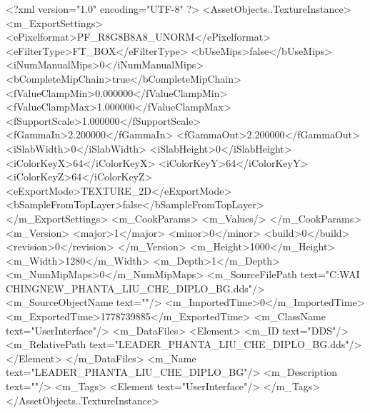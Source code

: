 <?xml version="1.0" encoding="UTF-8" ?>
<AssetObjects..TextureInstance>
	<m_ExportSettings>
		<ePixelformat>PF_R8G8B8A8_UNORM</ePixelformat>
		<eFilterType>FT_BOX</eFilterType>
		<bUseMips>false</bUseMips>
		<iNumManualMips>0</iNumManualMips>
		<bCompleteMipChain>true</bCompleteMipChain>
		<fValueClampMin>0.000000</fValueClampMin>
		<fValueClampMax>1.000000</fValueClampMax>
		<fSupportScale>1.000000</fSupportScale>
		<fGammaIn>2.200000</fGammaIn>
		<fGammaOut>2.200000</fGammaOut>
		<iSlabWidth>0</iSlabWidth>
		<iSlabHeight>0</iSlabHeight>
		<iColorKeyX>64</iColorKeyX>
		<iColorKeyY>64</iColorKeyY>
		<iColorKeyZ>64</iColorKeyZ>
		<eExportMode>TEXTURE_2D</eExportMode>
		<bSampleFromTopLayer>false</bSampleFromTopLayer>
	</m_ExportSettings>
	<m_CookParams>
		<m_Values/>
	</m_CookParams>
	<m_Version>
		<major>1</major>
		<minor>0</minor>
		<build>0</build>
		<revision>0</revision>
	</m_Version>
	<m_Height>1000</m_Height>
	<m_Width>1280</m_Width>
	<m_Depth>1</m_Depth>
	<m_NumMipMaps>0</m_NumMipMaps>
	<m_SourceFilePath text="C:\Users\YANG WAI CHING\Downloads\CIV\DDS NEW\LEADER_PHANTA_LIU_CHE_DIPLO_BG.dds"/>
	<m_SourceObjectName text=""/>
	<m_ImportedTime>0</m_ImportedTime>
	<m_ExportedTime>1778739885</m_ExportedTime>
	<m_ClassName text="UserInterface"/>
	<m_DataFiles>
		<Element>
			<m_ID text="DDS"/>
			<m_RelativePath text="LEADER_PHANTA_LIU_CHE_DIPLO_BG.dds"/>
		</Element>
	</m_DataFiles>
	<m_Name text="LEADER_PHANTA_LIU_CHE_DIPLO_BG"/>
	<m_Description text=""/>
	<m_Tags>
		<Element text="UserInterface"/>
	</m_Tags>
</AssetObjects..TextureInstance>

